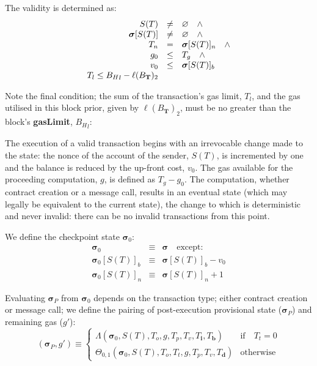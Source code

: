 \documentclass[9pt,oneside]{amsart}
\begin{document}
\begin{multicols}{2}
The validity is determined as:
\begin{equation}
\begin{array}[t]{rcl}
S(T) & \neq & \varnothing \quad \wedge \\
\boldsymbol{\sigma}[S(T)] & \neq & \varnothing \quad \wedge \\
T_n & = & \boldsymbol{\sigma}[S(T)]_n \quad \wedge \\
g_0 & \leq & T_g \quad \wedge \\ 
v_0 & \leq & \boldsymbol{\sigma}[S(T)]_b \\
T_l \leq {B_H}_l - \ell(B_\mathbf{T})_2
\end{array}
\end{equation}

Note the final condition; the sum of the transaction's gas limit, $T_l$, and the gas utilised in this block prior, given by $\ell(B_\mathbf{T})_2$, must be no greater than the block's \textbf{gasLimit}, ${B_H}_l$:

The execution of a valid transaction begins with an irrevocable change made to the state: the nonce of the account of the sender, $S(T)$, is incremented by one and the balance is reduced by the up-front cost, $v_0$. The gas available for the proceeding computation, $g$, is defined as $T_g - g_0$. The computation, whether contract creation or a message call, results in an eventual state (which may legally be equivalent to the current state), the change to which is deterministic and never invalid: there can be no invalid transactions from this point.

We define the checkpoint state $\boldsymbol{\sigma}_0$:
\begin{eqnarray}
\boldsymbol{\sigma}_0 & \equiv & \boldsymbol{\sigma} \quad \text{except:} \\
\boldsymbol{\sigma}_0[S(T)]_b & \equiv & \boldsymbol{\sigma}[S(T)]_b - v_0 \\
\boldsymbol{\sigma}_0[S(T)]_n & \equiv & \boldsymbol{\sigma}[S(T)]_n + 1
\end{eqnarray}

Evaluating $\boldsymbol{\sigma}_P$ from $\boldsymbol{\sigma}_0$ depends on the transaction type; either contract creation or message call; we define the pairing of post-execution provisional state ($\boldsymbol{\sigma}_P$) and remaining gas ($g'$):
\begin{equation}
(\boldsymbol{\sigma}_P, g') \equiv \begin{cases}
\Lambda(\boldsymbol{\sigma}_0, S(T), T_o, g, T_p, T_v, T_\mathbf{i}, T_\mathbf{b}) & \text{if} \quad T_t = 0 \\
\Theta_{0,1}(\boldsymbol{\sigma}_0, S(T), T_o, T_t, g, T_p, T_v, T_\mathbf{d}) & \text{otherwise}
\end{cases}
\end{equation}


\end{multicols}
\end{document}
